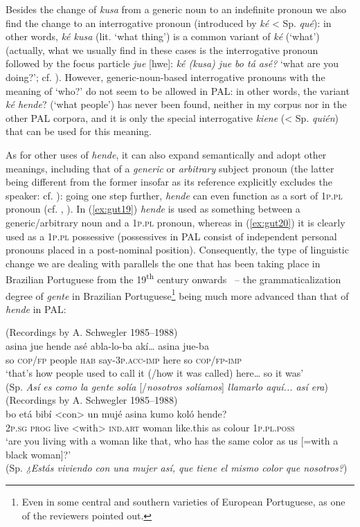 \documentclass[output=paper,colorlinks,citecolor=brown]{langscibook}
\begin{document}
Besides the change of \textit{kusa} from a generic noun to an indefinite pronoun we also find the change to an interrogative pronoun (introduced by \textit{ké} < Sp. \textit{qué}): in other words, \textit{ké kusa} (lit. ‘what thing’) is a common variant of \textit{ké} (‘what’) (actually, what we usually find in these cases is the interrogative pronoun followed by the focus particle \textit{jue} [hwe]: \textit{ké (kusa) jue bo tá asé?} ‘what are you doing?’; cf. \cite{GutiérrezMaté2017}). However, generic-noun-based interrogative pronouns with the meaning of ‘who?’ do not seem to be allowed in PAL: in other words, the variant \textit{ké hende}? (‘what people’) has never been found, neither in my corpus nor in the other PAL corpora, and it is only the special interrogative \textit{kiene} (< Sp. \textit{quién}) that can be used for this meaning.

As for other uses of \textit{hende}, it can also expand semantically and adopt other meanings, including that of a \textit{generic} or \textit{arbitrary} subject pronoun (the latter being different from the former insofar as its reference explicitly excludes the speaker: cf. \cite[63--64]{Holmberg2009}): going one step further, \textit{hende} can even function as a sort of 1\textsc{p.pl} pronoun (cf. \cite{Schwegler1993}, \citeyear{Schwegler2002}). In (\ref{ex:gut19}) \textit{hende} is used as something between a generic/arbitrary noun and a 1\textsc{p.pl} pronoun, whereas in (\ref{ex:gut20}) it is clearly used as a 1\textsc{p.pl} possessive (possessives in PAL consist of independent personal pronouns placed in a post-nominal position). Consequently, the type of linguistic change we are dealing with parallels the one that has been taking place in Brazilian Portuguese from the 19\textsuperscript{th} century onwards \citep{Lopes2003}~-- the grammaticalization degree of \textit{gente} in Brazilian Portuguese\footnote{Even in some central and southern varieties of European Portuguese, as one of the reviewers pointed out.} being much more advanced than that of \textit{hende} in PAL:\largerpage[-1]

\ea\label{ex:gut19}(Recordings by A. Schwegler 1985--1988)\\
\gll asina jue hende asé abla-lo-ba akí… asina jue-ba \\
so \textsc{cop/fp} people \textsc{hab} say-3\textsc{p.acc-imp} here so \textsc{cop/fp-imp} \\
\glt ‘that's how people used to call it (/how it was called) here… so it was’ \\
(Sp. \textit{Así es como la gente solía} [/\textit{nosotros solíamos}] \textit{llamarlo aquí... así era})
\pagebreak
\ex\label{ex:gut20}(Recordings by A. Schwegler 1985--1988)\\
\gll bo etá bibí <con> un mujé asina kumo koló hende? \\
2\textsc{p.sg} \textsc{prog} live <with> \textsc{ind.art} woman like.this as colour 1\textsc{p.pl.poss} \\
\glt ‘are you living with a woman like that, who has the same color as us [=with a black woman]?’ \\
(Sp. \textit{¿Estás viviendo con una mujer así, que tiene el mismo color que nosotros?})
\z
\end{document}
